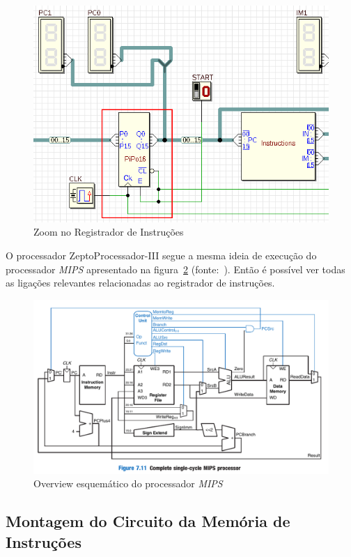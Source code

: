 \documentclass[12pt]{article}
\begin{document}
\begin{figure}[H]
    \centering
    \includegraphics[width=.9\textwidth]{Projeto/images/circuit__instruction_register.png}
    \caption{Zoom no Registrador de Instruções}\label{fig:circuit__instruction_register.png}
\end{figure}

O processador ZeptoProcessador-III segue a mesma ideia de execução do
processador \emph{MIPS} apresentado na figura~\ref{fig:circuit__MIPS.png}
(fonte:~\cite{Digital_Design}). Então é possível ver todas as ligações
relevantes relacionadas ao registrador de instruções.

\begin{figure}[H]
    \centering
    \includegraphics[width=.9\textwidth]{Projeto/images/circuit__MIPS.png}
    \caption{Overview esquemático do processador \emph{MIPS}}\label{fig:circuit__MIPS.png}
\end{figure}

\subsection{Montagem do Circuito da Memória de Instruções}\label{sec:2.2}
\end{document}
